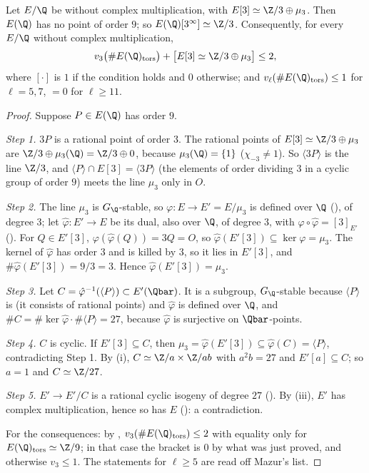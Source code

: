 \begin{proposition}\label{prop:ellcurves:no27}
Let $E/\Q$ be without complex multiplication, with $E[3]\simeq\Z/3\oplus\mu_3$. Then $E(\Q)$ has no point of order $9$; so $E(\Q)[3^\infty]\simeq\Z/3$. Consequently, for every $E/\Q$
without complex multiplication,
\[
v_3\bigl(\#E(\Q)_{\mathrm{tors}}\bigr)+\bigl[E[3]\simeq\Z/3\oplus\mu_3\bigr]\le2,
\]
where $[\cdot]$ is $1$ if the condition holds and $0$ otherwise; and $v_\ell(\#E(\Q)_{\mathrm{tors}})\le1$ for $\ell=5,7$, $=0$ for $\ell\ge11$.
\end{proposition}

\begin{proof}
Suppose $P\in E(\Q)$ has order $9$.

\emph{Step 1.} $3P$ is a rational point of order $3$. The rational points of $E[3]\simeq\Z/3\oplus\mu_3$ are $\Z/3\oplus\mu_3(\Q)=\Z/3\oplus0$, because $\mu_3(\Q)=\{1\}$ ($\chi_{-3}\ne1$). So
$\langle3P\rangle$ is the line $\Z/3$, and $\langle P\rangle\cap E[3]=\langle3P\rangle$ (the elements of order dividing $3$ in a cyclic group of order $9$) meets the line $\mu_3$ only in $O$.

\emph{Step 2.} The line $\mu_3$ is $G_\Q$-stable, so $\varphi\colon E\to E'=E/\mu_3$ is defined over $\Q$ (), of degree $3$; let $\hat\varphi\colon E'\to E$ be its dual, also
over $\Q$, of degree $3$, with $\varphi\circ\hat\varphi=[3]_{E'}$ (). For $Q\in E'[3]$, $\varphi(\hat\varphi(Q))=3Q=O$, so $\hat\varphi(E'[3])\subseteq\ker\varphi=\mu_3$. The kernel of
$\hat\varphi$ has order $3$ and is killed by $3$, so it lies in $E'[3]$, and $\#\hat\varphi(E'[3])=9/3=3$. Hence $\hat\varphi(E'[3])=\mu_3$.

\emph{Step 3.} Let $C=\hat\varphi^{-1}(\langle P\rangle)\subset E'(\Qbar)$. It is a subgroup, $G_\Q$-stable because $\langle P\rangle$ is (it consists of rational points) and $\hat\varphi$ is defined over $\Q$,
and $\#C=\#\ker\hat\varphi\cdot\#\langle P\rangle=27$, because $\hat\varphi$ is surjective on $\Qbar$-points.

\emph{Step 4.} $C$ is cyclic. If $E'[3]\subseteq C$, then $\mu_3=\hat\varphi(E'[3])\subseteq\hat\varphi(C)=\langle P\rangle$, contradicting Step 1. By (i), $C\simeq\Z/a\times\Z/ab$
with $a^2b=27$ and $E'[a]\subseteq C$; so $a=1$ and $C\simeq\Z/27$.

\emph{Step 5.} $E'\to E'/C$ is a rational cyclic isogeny of degree $27$ (). By (iii), $E'$ has complex multiplication, hence so
has $E$ (): a contradiction.

For the consequences: by , $v_3(\#E(\Q)_{\mathrm{tors}})\le2$ with equality only for $E(\Q)_{\mathrm{tors}}\simeq\Z/9$; in that case the bracket is $0$ by what was just proved,
and otherwise $v_3\le1$. The statements for $\ell\ge5$ are read off Mazur's list.
\end{proof}

